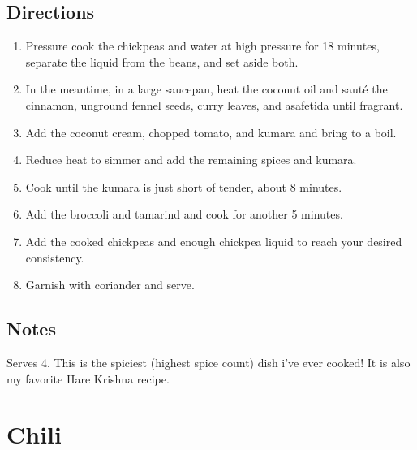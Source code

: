 \documentclass[letterpaper,10pt,english]{sphinxmanual}
\begin{document}
\section{Directions}
\label{chickpea_curry:directions}\begin{enumerate}
\item {} 
Pressure cook the chickpeas and water at high pressure for 18 minutes, separate the liquid from the beans, and set aside both.

\item {} 
In the meantime, in a large saucepan, heat the coconut oil and sauté the cinnamon, unground fennel seeds, curry leaves, and asafetida until fragrant.

\item {} 
Add the coconut cream, chopped tomato, and kumara and bring to a boil.

\item {} 
Reduce heat to simmer and add the remaining spices and kumara.

\item {} 
Cook until the kumara is just short of tender, about 8 minutes.

\item {} 
Add the broccoli and tamarind and cook for another 5 minutes.

\item {} 
Add the cooked chickpeas and enough chickpea liquid to reach your desired consistency.

\item {} 
Garnish with coriander and serve.

\end{enumerate}


\section{Notes}
\label{chickpea_curry:notes}
Serves 4. This is the spiciest (highest spice count) dish i’ve ever cooked! It is also my favorite Hare Krishna recipe.


\chapter{Chili}
\label{chili:chili}\label{chili::doc}
\end{document}
